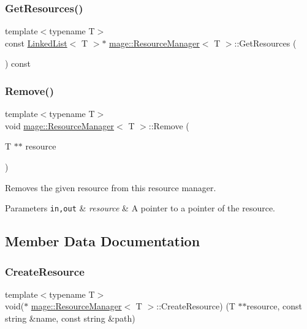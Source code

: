 \subsubsection{\texorpdfstring{Get\+Resources()}{GetResources()}}
{\footnotesize\ttfamily template$<$typename T$>$ \\
const \hyperlink{classmage_1_1_linked_list}{Linked\+List}$<$ T $>$$\ast$ \hyperlink{classmage_1_1_resource_manager}{mage\+::\+Resource\+Manager}$<$ T $>$\+::Get\+Resources (\begin{DoxyParamCaption}{ }\end{DoxyParamCaption}) const}

\hypertarget{classmage_1_1_resource_manager_a9fdc16b5f1627d0684c5a7e870290461}{}\label{classmage_1_1_resource_manager_a9fdc16b5f1627d0684c5a7e870290461} 
\subsubsection{\texorpdfstring{Remove()}{Remove()}}
{\footnotesize\ttfamily template$<$typename T$>$ \\
void \hyperlink{classmage_1_1_resource_manager}{mage\+::\+Resource\+Manager}$<$ T $>$\+::Remove (\begin{DoxyParamCaption}\item[{T $\ast$$\ast$}]{resource }\end{DoxyParamCaption})}

Removes the given resource from this resource manager.


\begin{DoxyParams}[1]{Parameters}
\mbox{\tt in,out}  & {\em resource} & A pointer to a pointer of the resource. \\
\hline
\end{DoxyParams}


\subsection{Member Data Documentation}
\hypertarget{classmage_1_1_resource_manager_a1175cdd82a5407dd099b53a432ca9a95}{}\label{classmage_1_1_resource_manager_a1175cdd82a5407dd099b53a432ca9a95} 
\subsubsection{\texorpdfstring{Create\+Resource}{CreateResource}}
{\footnotesize\ttfamily template$<$typename T$>$ \\
void($\ast$ \hyperlink{classmage_1_1_resource_manager}{mage\+::\+Resource\+Manager}$<$ T $>$\+::Create\+Resource) (T $\ast$$\ast$resource, const string \&name, const string \&path)\hspace{0.3cm}{\ttfamily [private]}}

